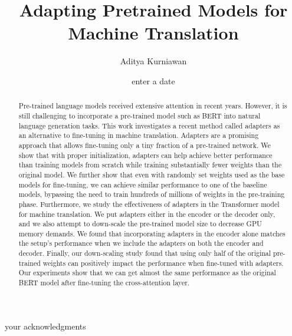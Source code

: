 \documentclass[12pt, a4paper]{report}
\theoremstyle{definition}
\theoremstyle{definition}%
\theoremstyle{definition}%
\theoremstyle{definition}%
\theoremstyle{definition}%
\theoremstyle{definition}%
\begin{document}
\title{Adapting Pretrained Models for Machine Translation}
\author{Aditya Kurniawan}
\date{enter a date}

\frontmatter


\begin{acknowledgements}
    your acknowledgments
\end{acknowledgements}

\begin{abstract}
    Pre-trained language models received extensive attention in recent years. However, it is still challenging to incorporate a pre-trained model such as BERT into natural language generation tasks. This work investigates a recent method called adapters as an alternative to fine-tuning in machine translation. Adapters are a promising approach that allows fine-tuning only a tiny fraction of a pre-trained network.
    We show that with proper initialization, adapters can help achieve better performance than training models from scratch while training substantially fewer weights than the original model.
    We further show that even with randomly set weights used as the base models for fine-tuning, we can achieve similar performance to one of the baseline models, bypassing the need to train hundreds of millions of weights in the pre-training phase.
    Furthermore, we study the effectiveness of adapters in the Transformer model for machine translation. We put adapters either in the encoder or the decoder only, and we also attempt to down-scale the pre-trained model size to decrease GPU memory demands.
    We found that incorporating adapters in the encoder alone matches the setup's performance when we include the adapters on both the encoder and decoder.
    Finally, our down-scaling study found that using only half of the original pre-trained weights can positively impact the performance when fine-tuned with adapters. Our experiments show that we can get almost the same performance as the original BERT model after fine-tuning the cross-attention layer.
\end{abstract}

\tableofcontents

\listoffigures

\listoftables



\mainmatter

\end{document}
